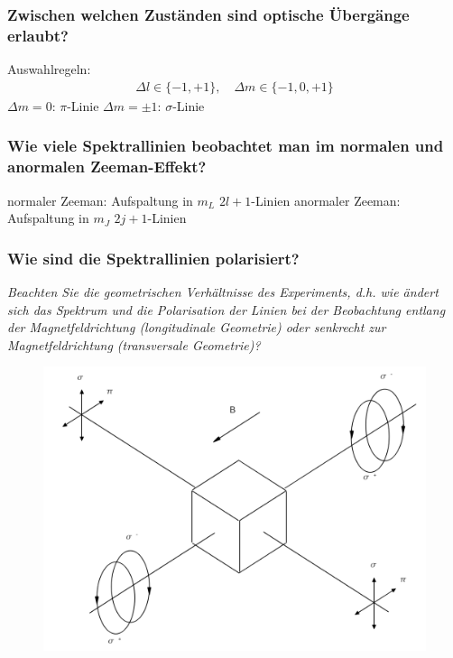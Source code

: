 \subsubsection{Zwischen welchen Zuständen sind optische Übergänge erlaubt?}
Auswahlregeln: 
\begin{align*}
    \Delta l\in\{-1,+1\},\quad\Delta m\in\{-1,0,+1\}
\end{align*}
$\Delta m=0$: $\pi$-Linie
$\Delta m=\pm1$: $\sigma$-Linie

\subsubsection{Wie viele Spektrallinien beobachtet man im normalen und anormalen Zeeman-Effekt?}
normaler Zeeman:  Aufspaltung in $m_L$ \to $2l+1$-Linien
anormaler Zeeman: Aufspaltung in $m_J$ \to $2j+1$-Linien

\subsubsection{Wie sind die Spektrallinien polarisiert?}
\textit{Beachten Sie die geometrischen Verhältnisse des Experiments, d.h. wie ändert sich das Spektrum und die Polarisation der Linien
bei der Beobachtung entlang der Magnetfeldrichtung (longitudinale Geometrie) oder senkrecht zur Magnetfeldrichtung (transversale
Geometrie)?}

\begin{figure}[H] %
    \centering
    \includegraphics[scale=0.4]{pictures/Polarisation.png}
\end{figure}


